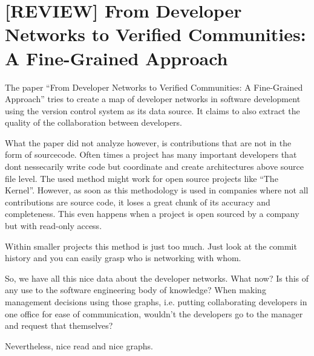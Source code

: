 \documentclass[a4paper,12pt,english]{scrartcl}
\newcommand{\papertitle}[2]{
	\section{[#1] #2}
}
\begin{document}
\pagestyle{fancy} %

\papertitle{REVIEW}{From Developer Networks to Verified Communities: A Fine-Grained Approach}

The paper \enquote{From Developer Networks to Verified Communities: A Fine-Grained Approach} tries to create a map of developer networks in software development using the version control system as its data source. It claims to also extract the quality of the collaboration between developers.

What the paper did not analyze however, is contributions that are not in the form of sourcecode. Often times a project has many important developers that dont nessecarily write code
but coordinate and create architectures above source file level. The used method might work for open source projects like \enquote{The Kernel}. However, as soon as this methodology
is used in companies where not all contributions are source code, it loses a great chunk of its accuracy and completeness. This even happens when a project is open sourced by a company but with read-only access.

Within smaller projects this method is just too much. Just look at the commit history and you can easily grasp who is networking with whom.

So, we have all this nice data about the developer networks. What now? Is this of any use to the software engineering body of knowledge? When making management decisions using those graphs, i.e. putting collaborating developers in one office for ease of communication, wouldn't the developers go to the manager and request that themselves?

Nevertheless, nice read and nice graphs.
\end{document}
